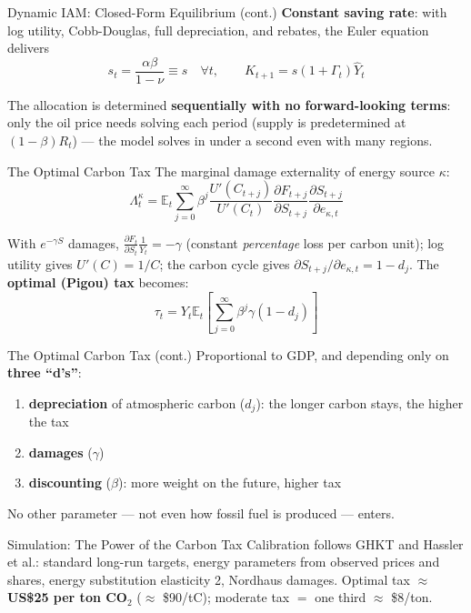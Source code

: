 \documentclass[blue]{beamer}
\newcommand{\E}{\mathbb{E}}
\begin{document}
\begin{frame}{Dynamic IAM: Closed-Form Equilibrium (cont.)}
\textbf{Constant saving rate}: with log utility, Cobb-Douglas, full depreciation, and rebates, the Euler equation delivers
\[
s_t = \frac{\alpha\beta}{1-\nu} \equiv s \quad \forall t, \qquad K_{t+1} = s(1+\Gamma_t)\hat{Y}_t
\]

The allocation is determined \textbf{sequentially with no forward-looking terms}: only the oil price needs solving each period (supply is predetermined at $(1-\beta)R_t$) --- the model solves in under a second even with many regions.
\end{frame}

\begin{frame}{The Optimal Carbon Tax}
The marginal damage externality of energy source $\kappa$:
\[
\Lambda^{\kappa}_t = \E_t\sum_{j=0}^{\infty}\beta^j\frac{U'(C_{t+j})}{U'(C_t)}\frac{\partial F_{t+j}}{\partial S_{t+j}}\frac{\partial S_{t+j}}{\partial e_{\kappa,t}}
\]

With $e^{-\gamma S}$ damages, $\frac{\partial F_t}{\partial S_t}\frac{1}{Y_t} = -\gamma$ (constant \emph{percentage} loss per carbon unit); log utility gives $U'(C) = 1/C$; the carbon cycle gives $\partial S_{t+j}/\partial e_{\kappa,t} = 1 - d_j$. The \textbf{optimal (Pigou) tax} becomes:
\[
\tau_t = Y_t \E_t\left[\sum_{j=0}^{\infty}\beta^j\gamma(1 - d_j)\right]
\]

\end{frame}

\begin{frame}{The Optimal Carbon Tax (cont.)}
Proportional to GDP, and depending only on \textbf{three ``d's''}:
\begin{enumerate}
    \item \textbf{depreciation} of atmospheric carbon ($d_j$): the longer carbon stays, the higher the tax
    \item \textbf{damages} ($\gamma$)
    \item \textbf{discounting} ($\beta$): more weight on the future, higher tax
\end{enumerate}
No other parameter --- not even how fossil fuel is produced --- enters.
\end{frame}

\begin{frame}{Simulation: The Power of the Carbon Tax}
Calibration follows GHKT and Hassler et al.: standard long-run targets, energy parameters from observed prices and shares, energy substitution elasticity 2, Nordhaus damages. Optimal tax $\approx$ \textbf{US\$25 per ton CO$_2$} ($\approx$ \$90/tC); moderate tax $=$ one third $\approx$ \$8/ton.

\end{frame}
\end{document}
